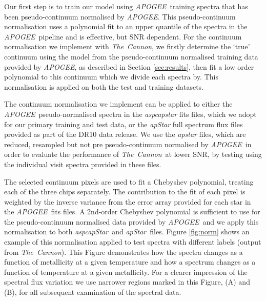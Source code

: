 \documentclass[12pt, preprint]{aastex}
\newcommand{\tc}{\textsl{The~Cannon}}
\newcommand{\apogee}{\textsl{APOGEE}}
\newcommand{\aspcapstar}{\textsl{aspcapStar}}
\newcommand{\apstar}{\textsl{apStar}}
\begin{document}
Our first step is to train our model using \apogee\ training spectra that has been pseudo-continuum normalised by \apogee. This pseudo-continuum normalisation uses a polynomial fit to an upper quantile of the spectra in the \apogee\ pipeline \citep{Meszaros2013} and is effective, but SNR dependent.  For the continuum normalisation we implement with \tc, we firstly determine the  `true' continuum using the model from the pseudo-continuum normalised training data provided by \apogee, as described in Section \ref{sec:results}, then fit a low order polynomial to this continuum which we divide each spectra by. This normalisation is applied on both the test and training datasets. 

The continuum normalisation we implement can be applied to either the \apogee\ pseudo-normalised spectra in the \textit{aspcapstar} fits files, which we adopt for our primary training and test data, or the \textit{apStar} full spectrum flux files provided as part of the DR10 data release. We use the \textit{apstar} files, which are reduced, resampled but not pre pseudo-continuum normalised by \apogee\, in order to evaluate the performance of \tc\ at lower SNR, by testing using the individual visit spectra provided in these files.  

The selected continuum pixels are used to fit a Chebyshev polynomial, treating each of the three chips separately. The contribution to the fit of each pixel is weighted by the inverse variance from the error array provided for each star in the \apogee\ fits files. A 2nd-order Chebyshev polynomial is sufficient to use for the pseudo-continuum normalised data provided by \apogee\ and we apply this normalisation to both \aspcapstar\ and  \apstar\ files.  Figure \ref{fig:norm} shows an example of this normalisation applied to test spectra with different labels (output from \tc). This Figure demonstrates how the spectra changes as a function of metallicity at a given temperature and how a spectrum changes as a function of temperature at a given metallicity. For a clearer impression of the spectral flux variation we use narrower regions marked in this Figure, (A) and (B), for all subsequent examination of the spectral data. 

\end{document}
